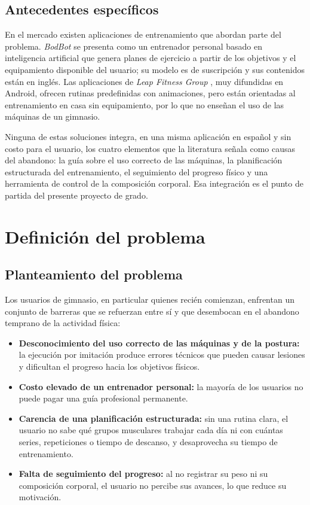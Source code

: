 \subsection{Antecedentes específicos}

En el mercado existen aplicaciones de entrenamiento que abordan parte del
problema. \emph{BodBot} \citep{bodbot} se presenta como un entrenador personal
basado en inteligencia artificial que genera planes de ejercicio a partir de
los objetivos y el equipamiento disponible del usuario; su modelo es de
suscripción y sus contenidos están en inglés. Las aplicaciones de
\emph{Leap Fitness Group} \citep{leapfitness}, muy difundidas en Android,
ofrecen rutinas predefinidas con animaciones, pero están orientadas al
entrenamiento en casa sin equipamiento, por lo que no enseñan el uso de las
máquinas de un gimnasio.

Ninguna de estas soluciones integra, en una misma aplicación en español y sin
costo para el usuario, los cuatro elementos que la literatura señala como
causas del abandono: la guía sobre el uso correcto de las máquinas, la
planificación estructurada del entrenamiento, el seguimiento del progreso
físico y una herramienta de control de la composición corporal. Esa
integración es el punto de partida del presente proyecto de grado.

\section{Definición del problema}
\label{sec:problema}

\subsection{Planteamiento del problema}

Los usuarios de gimnasio, en particular quienes recién comienzan, enfrentan
un conjunto de barreras que se refuerzan entre sí y que desembocan en el
abandono temprano de la actividad física:

\begin{itemize}
    \item \textbf{Desconocimiento del uso correcto de las máquinas y de la
    postura:} la ejecución por imitación produce errores técnicos que pueden
    causar lesiones y dificultan el progreso hacia los objetivos físicos.
    \item \textbf{Costo elevado de un entrenador personal:} la mayoría de los
    usuarios no puede pagar una guía profesional permanente.
    \item \textbf{Carencia de una planificación estructurada:} sin una rutina
    clara, el usuario no sabe qué grupos musculares trabajar cada día ni con
    cuántas series, repeticiones o tiempo de descanso, y desaprovecha su
    tiempo de entrenamiento.
    \item \textbf{Falta de seguimiento del progreso:} al no registrar su peso
    ni su composición corporal, el usuario no percibe sus avances, lo que
    reduce su motivación.
\end{itemize}

